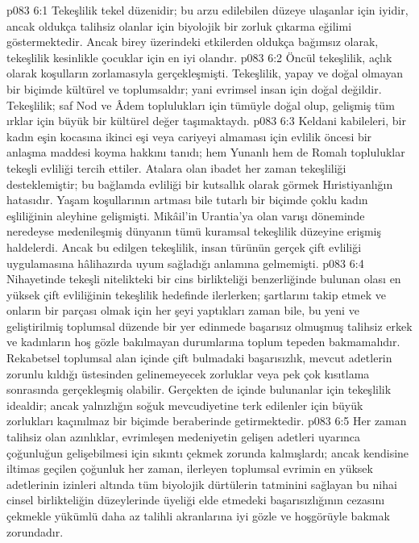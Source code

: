\vs p083 6:1 Tekeşlilik tekel düzenidir; bu arzu edilebilen düzeye ulaşanlar için iyidir, ancak oldukça talihsiz olanlar için biyolojik bir zorluk çıkarma eğilimi göstermektedir. Ancak birey üzerindeki etkilerden oldukça bağımsız olarak, tekeşlilik kesinlikle çocuklar için en iyi olandır.
\vs p083 6:2 Öncül tekeşlilik, açlık olarak koşulların zorlamasıyla gerçekleşmişti. Tekeşlilik, yapay ve doğal olmayan bir biçimde kültürel ve toplumsaldır; yani evrimsel insan için doğal değildir. Tekeşlilik; saf Nod ve Âdem toplulukları için tümüyle doğal olup, gelişmiş tüm ırklar için büyük bir kültürel değer taşımaktaydı.
\vs p083 6:3 Keldani kabileleri, bir kadın eşin kocasına ikinci eşi veya cariyeyi almaması için evlilik öncesi bir anlaşma maddesi koyma hakkını tanıdı; hem Yunanlı hem de Romalı topluluklar tekeşli evliliği tercih ettiler. Atalara olan ibadet her zaman tekeşliliği desteklemiştir; bu bağlamda evliliği bir kutsallık olarak görmek Hıristiyanlığın hatasıdır. Yaşam koşullarının artması bile tutarlı bir biçimde çoklu kadın eşliliğinin aleyhine gelişmişti. Mikâil’in Urantia’ya olan varışı döneminde neredeyse medenileşmiş dünyanın tümü kuramsal tekeşlilik düzeyine erişmiş haldelerdi. Ancak bu edilgen tekeşlilik, insan türünün gerçek çift evliliği uygulamasına hâlihazırda uyum sağladığı anlamına gelmemişti.
\vs p083 6:4 Nihayetinde tekeşli nitelikteki bir cins birlikteliği benzerliğinde bulunan olası en yüksek çift evliliğinin tekeşlilik hedefinde ilerlerken; şartlarını takip etmek ve onların bir parçası olmak için her şeyi yaptıkları zaman bile, bu yeni ve geliştirilmiş toplumsal düzende bir yer edinmede başarısız olmuşmuş talihsiz erkek ve kadınların hoş gözle bakılmayan durumlarına toplum tepeden bakmamalıdır. Rekabetsel toplumsal alan içinde çift bulmadaki başarısızlık, mevcut adetlerin zorunlu kıldığı üstesinden gelinemeyecek zorluklar veya pek çok kısıtlama sonrasında gerçekleşmiş olabilir. Gerçekten de içinde bulunanlar için tekeşlilik idealdir; ancak yalnızlığın soğuk mevcudiyetine terk edilenler için büyük zorlukları kaçınılmaz bir biçimde beraberinde getirmektedir.
\vs p083 6:5 Her zaman talihsiz olan azınlıklar, evrimleşen medeniyetin gelişen adetleri uyarınca çoğunluğun gelişebilmesi için sıkıntı çekmek zorunda kalmışlardı; ancak kendisine iltimas geçilen çoğunluk her zaman, ilerleyen toplumsal evrimin en yüksek adetlerinin izinleri altında tüm biyolojik dürtülerin tatminini sağlayan bu nihai cinsel birlikteliğin düzeylerinde üyeliği elde etmedeki başarısızlığının cezasını çekmekle yükümlü daha az talihli akranlarına iyi gözle ve hoşgörüyle bakmak zorundadır.
